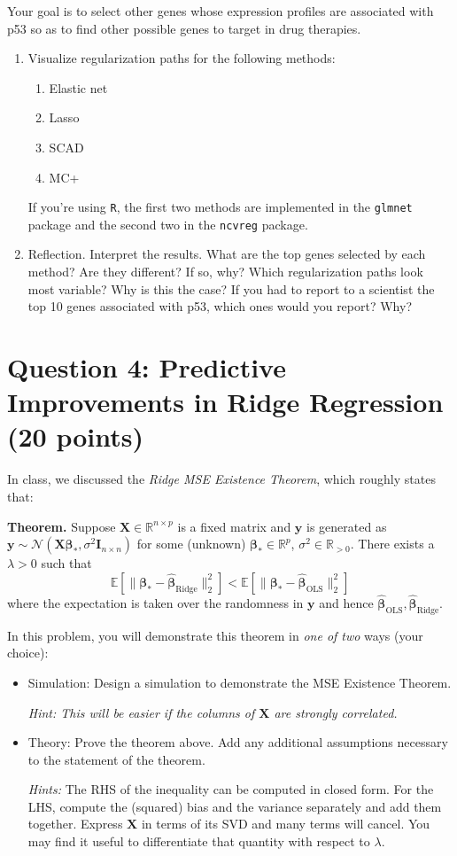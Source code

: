 \documentclass[10pt]{article}
\newcommand{\R}{\mathbb{R}}
\newcommand{\bI}{\bm{I}}
\newcommand{\bX}{\bm{X}}
\newcommand{\by}{\bm{y}}
\newcommand{\bbeta}{\bm{\beta}}
\newcommand{\E}{\mathbb{E}}
\begin{document}
Your goal is to select other genes whose expression profiles are associated with p53 so as to find other possible genes to target in drug therapies.
\begin{enumerate}
    \item Visualize regularization paths for the following methods:
    \begin{enumerate}
        \item Elastic net
        \item Lasso
        \item SCAD
        \item MC+
    \end{enumerate}
    If you're using \texttt{R}, the first two methods are implemented in the \texttt{glmnet} package and the second two in the \texttt{ncvreg} package. 
    \item Reflection. Interpret the results. What are the top genes selected by each method? Are they different? If so, why? Which regularization paths look most variable? Why is this the case? If you had to report to a scientist the top 10 genes associated with p53, which ones would you report? Why?
\end{enumerate}
\section*{Question 4: Predictive Improvements in Ridge Regression (20 points)}

In class, we discussed the \emph{Ridge MSE Existence Theorem}, which roughly states that: 

\textbf{Theorem.} Suppose $\bX \in \R^{n \times p}$ is a fixed matrix and $\by$ is generated as $\by \sim \mathcal{N}(\bX\bbeta_*, \sigma^2 \bI_{n \times n})$ for some (unknown) $\bbeta_* \in \R^p$, $\sigma^2 \in \R_{> 0}$. There exists a $\lambda > 0$ such that 
\[\E[\|\bbeta_* - \hat{\bbeta}_{\text{Ridge}}\|_2^2] < \E[\|\bbeta_* - \hat{\bbeta}_{\text{OLS}}\|_2^2]\]
where the expectation is taken over the randomness in $\by$ and hence $\hat{\bbeta}_{\text{OLS}}, \hat{\bbeta}_{\text{Ridge}}$. 

In this problem, you will demonstrate this theorem in \emph{one of two} ways (your choice):
\begin{itemize}
    \item Simulation: Design a simulation to demonstrate the MSE Existence Theorem.

    \emph{Hint: This will be easier if the columns of $\bX$ are strongly correlated.}
    
    \item Theory: Prove the theorem above. Add any additional assumptions necessary to the statement of the theorem.

    \emph{Hints:} The RHS of the inequality can be computed in closed form. For the LHS, compute the (squared) bias and the variance separately and add them together. Express $\bX$ in terms of its SVD and many terms will cancel. You may find it useful to differentiate that quantity with respect to $\lambda$.
\end{itemize}
\end{document}
